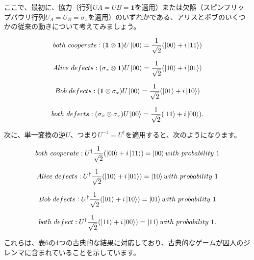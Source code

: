 ここで、最初に、協力（行列$UA = UB = \mathbf{1}$を適用）または欠陥（スピンフリップパウリ行列$U_A = U_B = \sigma_x$を適用）のいずれかである、アリスとボブのいくつかの従来の動きについて考えてみましょう。

\begin{equation}
\label{138}
both \ cooperate:
(\mathbf{1} \otimes \mathbf{1}) 
U \ket{00}
=
\frac{1}{\sqrt{2}}
( \ket{00} + i \ket{11})
\end{equation}

\begin{equation}
\label{139}
Alice \ defects:
(\sigma_x \otimes \mathbf{1}) 
U \ket{00}
=
\frac{1}{\sqrt{2}}
( \ket{10} + i \ket{01})
\end{equation}

\begin{equation}
\label{140}
Bob \ defects:
( \mathbf{1} \otimes \sigma_x) 
U \ket{00}
=
\frac{1}{\sqrt{2}}
( \ket{01} + i \ket{10})
\end{equation}

\begin{equation}
\label{141}
both \ defects:
( \sigma_x \otimes \sigma_x) 
U \ket{00}
=
\frac{1}{\sqrt{2}}
( \ket{11} + i \ket{00}).
\end{equation}

次に、単一変換の逆$U$、つまり$U^{-1} = U^{\dagger}$を適用すると、次のようになります。

\begin{equation}
\label{142}
both \ cooperate:
U^{\dagger}
\frac{1}{\sqrt{2}}
( \ket{00} + i \ket{11})
=
\ket{00}
with \ probability \ 1 
\end{equation}

\begin{equation}
\label{143}
Alice \ defects:
U^{\dagger}
\frac{1}{\sqrt{2}}
( \ket{10} + i \ket{01})
=
\ket{10}
with \ probability \ 1 
\end{equation}

\begin{equation}
\label{144}
Bob \ defects:
U^{\dagger}
\frac{1}{\sqrt{2}}
( \ket{01} + i \ket{10})
=
\ket{01}
with \ probability \ 1 
\end{equation}

\begin{equation}
\label{145}
both \ defect:
U^{\dagger}
\frac{1}{\sqrt{2}}
( \ket{11} + i \ket{00})
=
\ket{11}
with \ probability \ 1 .
\end{equation}

これらは、表6の4つの古典的な結果に対応しており、古典的なゲームが囚人のジレンマに含まれていることを示しています。

